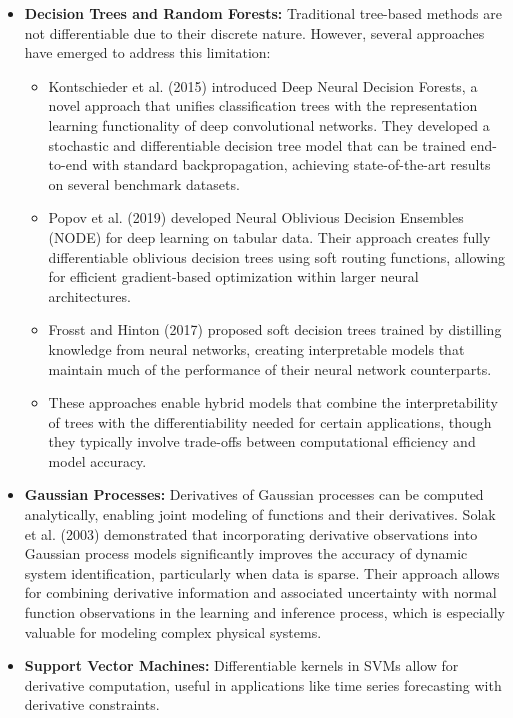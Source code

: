 \documentclass{article}
\begin{document}
\begin{itemize}
    \item \textbf{Decision Trees and Random Forests:} Traditional tree-based methods are not differentiable due to their discrete nature. However, several approaches have emerged to address this limitation:
    \begin{itemize}
        \item Kontschieder et al. (2015) introduced Deep Neural Decision Forests, a novel approach that unifies classification trees with the representation learning functionality of deep convolutional networks. They developed a stochastic and differentiable decision tree model that can be trained end-to-end with standard backpropagation, achieving state-of-the-art results on several benchmark datasets.
        
        \item Popov et al. (2019) developed Neural Oblivious Decision Ensembles (NODE) for deep learning on tabular data. Their approach creates fully differentiable oblivious decision trees using soft routing functions, allowing for efficient gradient-based optimization within larger neural architectures.
        
        \item Frosst and Hinton (2017) proposed soft decision trees trained by distilling knowledge from neural networks, creating interpretable models that maintain much of the performance of their neural network counterparts.
        
        \item These approaches enable hybrid models that combine the interpretability of trees with the differentiability needed for certain applications, though they typically involve trade-offs between computational efficiency and model accuracy.
    \end{itemize}
    
    \item \textbf{Gaussian Processes:} Derivatives of Gaussian processes can be computed analytically, enabling joint modeling of functions and their derivatives. Solak et al. (2003) demonstrated that incorporating derivative observations into Gaussian process models significantly improves the accuracy of dynamic system identification, particularly when data is sparse. Their approach allows for combining derivative information and associated uncertainty with normal function observations in the learning and inference process, which is especially valuable for modeling complex physical systems.
    
    \item \textbf{Support Vector Machines:} Differentiable kernels in SVMs allow for derivative computation, useful in applications like time series forecasting with derivative constraints.
\end{itemize}
\end{document}
